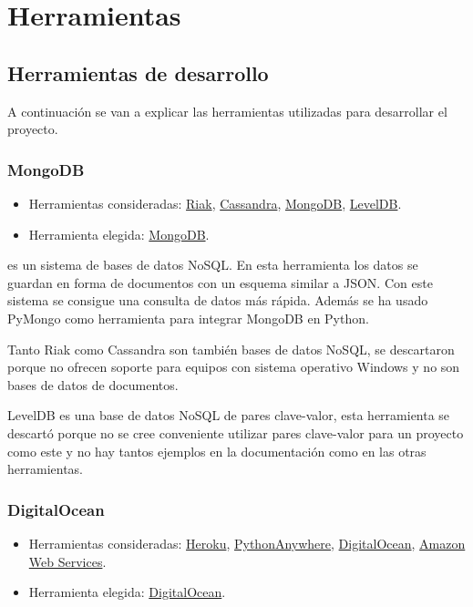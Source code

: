 \section{Herramientas}

\subsection{Herramientas de desarrollo}

A continuación se van a explicar las herramientas utilizadas para desarrollar el proyecto.

\subsubsection{MongoDB}

\begin{itemize}
	\tightlist
	\item
	Herramientas consideradas:
	\href{http://basho.com/riak/}{Riak}, 
	\href{http://cassandra.apache.org/}{Cassandra},
	\href{https://www.mongodb.com/}{MongoDB}, 
	\href{http://leveldb.org/}{LevelDB}.
	\item
	Herramienta elegida:
	\href{https://www.mongodb.com/}{MongoDB}.
\end{itemize}

 \cite{misc:mongodb} es un sistema de bases de datos NoSQL. En esta herramienta los datos se guardan en forma de documentos con un esquema similar a JSON. Con este sistema se consigue una consulta de datos más rápida. Además se ha usado PyMongo \cite{docs:pymongo} como herramienta para integrar MongoDB en Python.

Tanto Riak como Cassandra son también bases de datos NoSQL, se descartaron porque no ofrecen soporte para equipos con sistema operativo Windows y no son bases de datos de documentos. 

LevelDB es una base de datos NoSQL de pares clave-valor, esta herramienta se descartó porque no se cree conveniente utilizar pares clave-valor para un proyecto como este y no hay tantos ejemplos en la documentación como en las otras herramientas.

\subsubsection{DigitalOcean} \label{digitalocean}

\begin{itemize}
	\tightlist
	\item
	Herramientas consideradas:
	\href{https://www.heroku.com/}{Heroku}, 
	\href{https://www.pythonanywhere.com/}{PythonAnywhere},
	\href{https://www.digitalocean.com/}{DigitalOcean}, 
	\href{https://aws.amazon.com/es/}{Amazon Web Services}.
	\item
	Herramienta elegida:
	\href{https://www.digitalocean.com/}{DigitalOcean}.
\end{itemize}

